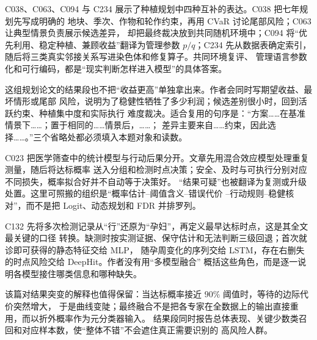 C038、C063、C094 与 C234 展示了种植规划中四种互补的表达。C038 把七年规划先写成明确的
地块、季次、作物和轮作约束，再用 CVaR 讨论尾部风险；C063 让典型情景负责展示候选差异，
却把最终裁决放到共同随机环境中；C094 将“优先利用、稳定种植、兼顾收益”翻译为管理参数
$p/q$；C234 先从数据表确定索引，随后将三类真实邻接关系写进染色体和修复算子。共同环境复评、
管理语言参数化和可行编码，都是“现实判断怎样进入模型”的具体答案。

这组规划论文的结果段也不把“收益更高”单独拿出来。作者会同时写期望收益、最坏情形或尾部
风险，说明为了稳健性牺牲了多少利润；候选差别很小时，回到活跃约束、种植集中度和实际执行
难度裁决。适合复用的句序是：“方案……在基准情景下……；置于相同的……情景后，……；
差异主要来自……约束，因此选择……。”三个省略处都必须填入本题对象和读数。

C023 把医学筛查中的统计模型与行动后果分开。文章先用混合效应模型处理重复测量，随后将达标概率
送入分组和检测时点决策；安全、及时与可执行分别对应不同损失，概率拟合好并不自动等于决策好。
“结果可疑”也被翻译为复测或升级处置。这里可照搬的组织是“概率估计--阈值含义--错误代价
--行动规则--稳健核对”，而不是把 Logit、动态规划和 FDR 并排罗列。

C132 先将多次检测记录从“行”还原为“孕妇”，再定义最早达标时点，这是其全文最关键的口径
转换。缺测时按实测证据、保守估计和无法判断三级回退；首次就诊即可获得的静态特征交给 MLP，
随孕周变化的序列交给 LSTM，存在右删失的时点风险交给 DeepHit。作者没有用“多模型融合”
概括这些角色，而是逐一说明各模型接住哪类信息和哪种缺失。

该篇对结果突变的解释也值得保留：当达标概率接近 $90\%$ 阈值时，等待的边际代价突然增大，
于是曲线变陡；最终融合不是把各专家在全数据上的输出直接重用，而以折外概率作为元分类器输入。
结果段同时报告总体表现、关键少数类召回和对应样本数，使“整体不错”不会遮住真正需要识别的
高风险人群。
